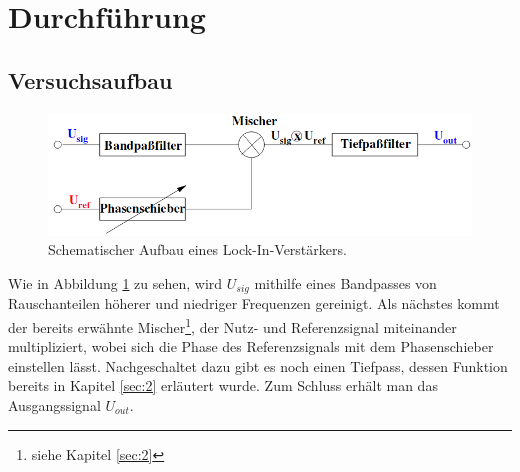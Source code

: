 \section{Durchführung}
\subsection{Versuchsaufbau}
\label{sec:3.1}
\begin{figure}
  \centering
  \includegraphics[scale=0.4]{aufbau.png}
  \caption{Schematischer Aufbau eines Lock-In-Verstärkers.}
  \label{fig:2}
\end{figure}
Wie in Abbildung \ref{fig:2} zu sehen, wird $U_{sig}$ mithilfe eines Bandpasses
von Rauschanteilen höherer und niedriger Frequenzen gereinigt. Als nächstes kommt
der bereits erwähnte Mischer\footnote{siehe Kapitel \ref{sec:2}}, der Nutz- und
Referenzsignal miteinander multipliziert, wobei sich die Phase des Referenzsignals
mit dem Phasenschieber einstellen lässt. Nachgeschaltet dazu gibt es noch einen
Tiefpass, dessen Funktion bereits in Kapitel \ref{sec:2} erläutert wurde. Zum
Schluss erhält man das Ausgangssignal $U_ {out}$.

